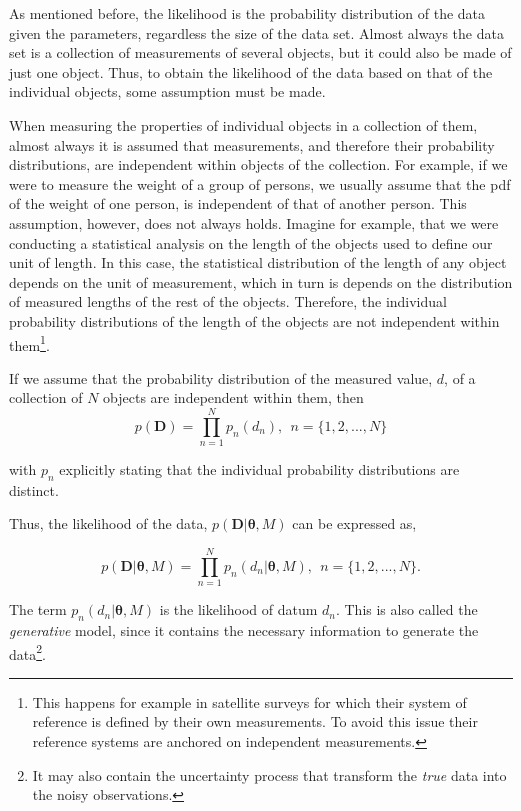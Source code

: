 As mentioned before, the likelihood is the probability distribution of the data given the parameters, regardless the size of the data set. Almost always the data set is a collection of measurements of several objects, but it could also be made of just one object. Thus, to obtain the likelihood of the data based on that of the individual objects, some assumption must be made. 

When measuring the properties of individual objects in a collection of them, almost always it is assumed that measurements, and therefore their probability distributions, are independent within objects of the collection. For example, if we were to measure the weight of a group of persons, we usually assume that the pdf of the weight of one person, is independent of that of another person. This assumption, however, does not always holds. Imagine for example, that we were conducting a statistical analysis on the length of the objects used to define our unit of length. In this case, the statistical distribution of the length of any object depends on the unit of measurement, which in turn is depends on the distribution of measured lengths of the rest of the objects. Therefore, the individual probability distributions of the length of the objects are not independent within them\footnote{This happens for example in satellite surveys for which their system of reference is defined by their own measurements. To avoid this issue their reference systems are anchored on independent measurements.}. 

If we assume that the probability distribution of the measured value, $d$, of a collection of $N$ objects are independent within them, then
\begin{equation}
\label{eq:independence}
 p(\mathbf{D}) = \prod_{n=1}^N p_n(d_n), \ \ n=\{1,2,...,N\}
\end{equation}

 with $p_n$ explicitly stating that the individual probability distributions are distinct. 
 
 Thus, the likelihood of the data, $p(\mathbf{D}|\mathbf{\theta},M)$ can be expressed as,

\begin{equation}
\label{eq:lik_datum}
 p(\mathbf{D}|\mathbf{\theta},M) = \prod_{n=1}^N p_n(d_n|\mathbf{\theta},M), \ \ n=\{1,2,...,N\}.
\end{equation}

The term $p_n(d_n|\mathbf{\theta},M)$ is the likelihood of datum $d_n$. This is also called the \emph{generative} model, since it  contains the necessary information to generate the data\footnote{It may also contain the uncertainty process that transform the \emph{true} data into the noisy observations.}.

